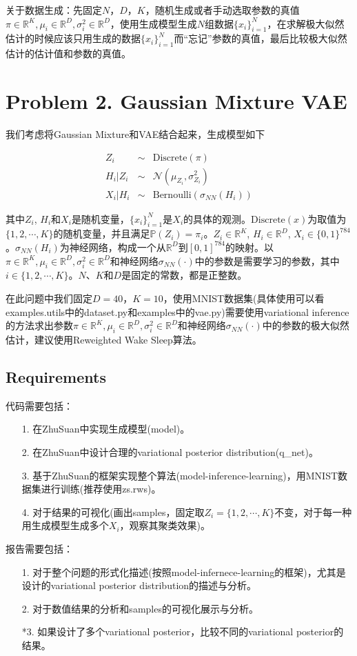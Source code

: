 \documentclass{article}
\begin{document}
关于数据生成：先固定$N$，$D$，$K$，随机生成或者手动选取参数的真值$\pi \in \mathbb{R}^K, \mu_i \in \mathbb{R}^D, \sigma^2_i \in \mathbb{R}^D$，使用生成模型生成$N$组数据$\{x_i\}_{i=1}^N$，在求解极大似然估计的时候应该只用生成的数据$\{x_i\}_{i=1}^N$而“忘记”参数的真值，最后比较极大似然估计的估计值和参数的真值。

\section{Problem 2. Gaussian Mixture VAE}

我们考虑将Gaussian Mixture和VAE结合起来，生成模型如下

\begin{eqnarray}
	Z_i &\sim& \mathrm{Discrete}(\pi) \\
	H_i \lvert Z_i &\sim& \mathcal{N}(\mu_{Z_i}, \sigma^2_{Z_i}) \\
	X_i \lvert H_i &\sim& \mathrm{Bernoulli}(\sigma_{NN}(H_i))
\end{eqnarray}

其中$Z_i$, $H_i$和$X_i$是随机变量，$\{x_i\}_{i=1}^N$是$X_i$的具体的观测。$\mathrm{Discrete}(x)$为取值为$\{1,2,\cdots,K\}$的随机变量，并且满足$\mathbb{P}(Z_i)=\pi_i$。$Z_i \in \mathbb{R}^K$, $H_i \in \mathbb{R}^D$, $X_i \in \{0,1\}^{784}$。$\sigma_{NN}(H_i)$为神经网络，构成一个从$\mathbb{R}^D$到$[0,1]^{784}$的映射。以 $\pi \in \mathbb{R}^K, \mu_i \in \mathbb{R}^D, \sigma^2_i \in \mathbb{R}^D$和神经网络$\sigma_{NN}(\cdot)$中的参数是需要学习的参数，其中$i \in \{1, 2, \cdots, K\}$。$N$、$K$和$D$是固定的常数，都是正整数。

在此问题中我们固定$D=40$，$K=10$，使用MNIST数据集(具体使用可以看examples.utils中的dataset.py和examples中的vae.py)需要使用variational inference的方法求出参数$\pi \in \mathbb{R}^K, \mu_i \in \mathbb{R}^D, \sigma^2_i \in \mathbb{R}^D$和神经网络$\sigma_{NN}(\cdot)$中的参数的极大似然估计，建议使用Reweighted Wake Sleep算法。

\subsection{Requirements}

代码需要包括：

\begin{itemize}
	\item [1.] 在ZhuSuan中实现生成模型(model)。
	\item [2.] 在ZhuSuan中设计合理的variational posterior distribution(q\_net)。
	\item [3.] 基于ZhuSuan的框架实现整个算法(model-inference-learning)，用MNIST数据集进行训练(推荐使用zs.rws)。
	\item [4.] 对于结果的可视化(画出samples，固定取$Z_i=\{1,2,\cdots,K\}$不变，对于每一种用生成模型生成多个$X_i$，观察其聚类效果)。
\end{itemize}

报告需要包括：

\begin{itemize}
	\item [1.] 对于整个问题的形式化描述(按照model-infernece-learning的框架)，尤其是设计的variational posterior distribution的描述与分析。
	\item [2.] 对于数值结果的分析和samples的可视化展示与分析。
	\item [*3.] 如果设计了多个variational posterior，比较不同的variational posterior的结果。
\end{itemize}
\end{document}
